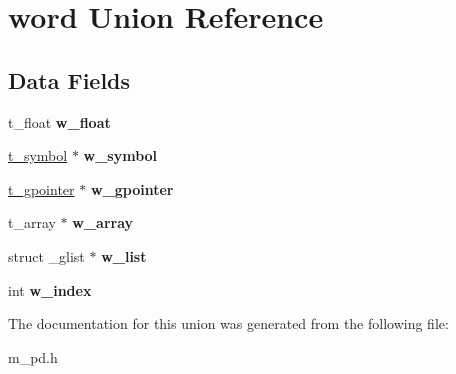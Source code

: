 \hypertarget{unionword}{}\section{word Union Reference}
\label{unionword}
\subsection*{Data Fields}
\begin{DoxyCompactItemize}
\item 
\mbox{\label{unionword_a3c5165bbd8505472fd8608dcb99b7ab9}} 
t\+\_\+float {\bfseries w\+\_\+float}
\item 
\mbox{\label{unionword_a89a95e26fb2b30ebe70204de2c3fa099}} 
\hyperlink{struct__symbol}{t\+\_\+symbol} $\ast$ {\bfseries w\+\_\+symbol}
\item 
\mbox{\label{unionword_a93fe0df3a2b3388336f6e71b55742d6c}} 
\hyperlink{struct__gpointer}{t\+\_\+gpointer} $\ast$ {\bfseries w\+\_\+gpointer}
\item 
\mbox{\label{unionword_af8427520e3abf9c0d26732a38056d6cb}} 
t\+\_\+array $\ast$ {\bfseries w\+\_\+array}
\item 
\mbox{\label{unionword_a849bfad495d86a401a0228015b90c9ac}} 
struct \+\_\+glist $\ast$ {\bfseries w\+\_\+list}
\item 
\mbox{\label{unionword_a985fdabd5996a0ae1ed311855f8e4be7}} 
int {\bfseries w\+\_\+index}
\end{DoxyCompactItemize}


The documentation for this union was generated from the following file\+:\begin{DoxyCompactItemize}
\item 
m\+\_\+pd.\+h\end{DoxyCompactItemize}
